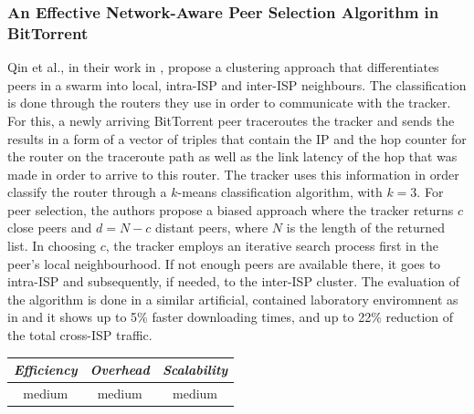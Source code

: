 \subsubsection{An Effective Network-Aware Peer Selection Algorithm in
BitTorrent}
Qin et al., in their work in \cite{qlzg_biteffpeersel_2009}, propose a
clustering approach that differentiates peers in a swarm into local, intra-ISP
and inter-ISP neighbours. The classification is done through the routers they
use in order to communicate with the tracker. For this, a newly arriving
BitTorrent peer traceroutes the tracker and sends the results in a form of a
vector of triples that contain the IP and the hop counter for the router on the
traceroute path as well as the link latency of the hop that was made in order to
arrive to this router. The tracker uses this information in order classify the
router through a $k$-means classification algorithm, with $k = 3$. For peer
selection, the authors propose a biased approach where the tracker returns $c$
close peers and $d = N - c$ distant peers, where $N$ is the length of the
returned list. In choosing $c$, the tracker employs an iterative search process
first in the peer's local neighbourhood. If not enough peers are available
there, it goes to intra-ISP and subsequently, if needed, to the inter-ISP
cluster. The evaluation of the algorithm is done in a similar artificial,
contained laboratory enviromnent as in \cite{lcy_utaps_2008} and it shows up to
5\% faster downloading times, and up to 22\% reduction of the total cross-ISP
traffic.

\begin{center}
\begin{tabular}{ccc}
\emph{Efficiency} & \emph{Overhead} & \emph{Scalability} \\
\hline
medium &
medium &
medium
\end{tabular}
\end{center}

